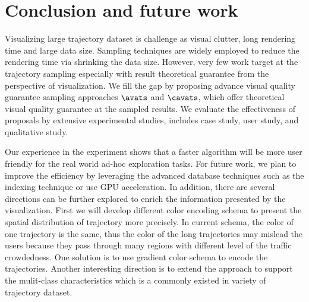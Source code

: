\section{Conclusion and future work}\label{sec:con}

Visualizing large trajectory dataset is challenge as visual clutter, long rendering time and large data size.
Sampling techniques are widely employed to reduce the rendering time via shrinking the data size.
However, very few work target at the trajectory sampling especially with result theoretical guarantee from the perspective of visualization.
We fill the gap by proposing advance visual quality guarantee sampling approaches $\avats$ and $\cavats$, which offer theoretical visual quality guarantee at the sampled results.
We evaluate the effectiveness of proposals  by extensive experimental studies, includes case study, user study, and qualitative study.



Our experience in the experiment shows that a faster algorithm will be more user friendly for the real world ad-hoc exploration tasks.
For future work, we plan to improve the efficiency by leveraging the advanced database techniques such as the indexing technique or use GPU acceleration.
In addition, there are several directions can be further explored to enrich the information presented by the visualization.
First we will develop different color encoding schema to present the spatial distribution of trajectory more precisely.
In current schema, the color of one trajectory is the same, thus the color of the long trajectories may mislead the users because they pass through many regions with different level of the traffic crowdedness. One solution is to use gradient color schema to encode the trajectories.
Another interesting direction is to extend the approach to support the mulit-class characteristics which is a commonly existed in variety of trajectory dataset. 